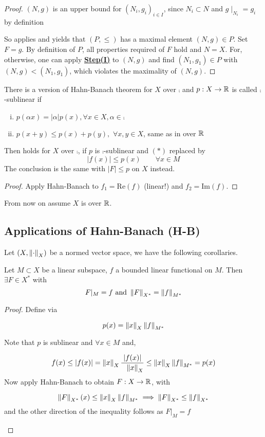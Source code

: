 \documentclass{article}
\begin{document}
\begin{proof}
$(N,g)$ is an upper bound for $(N_i, g_i)_{i \in I}$, since $N_i \subset N$ and $g\mid_{N_i} = g_i$ by definition  

So  applies and yields that $(P, \leq)$ has a maximal element $(N,g)\in P$. Set $F=g$.  
By definition of $P$, all properties required of $F$ hold and $N=X$. For, otherwise, one can apply \underline{\textbf{Step(I)}} to $(N,g)$ and find $(N_1, g_1) \in P$ with $(N,g) < (N_1, g_1)$, which violates the maximality of $(N,g)$.
\end{proof}


\begin{remark}
There is a version of Hahn-Banach theorem for $X$ over $\comp$ and $p: X\to \mathbb{R}$ is called $\comp$-sublinear if  
\begin{enumerate}[i)]
    \item $p(\alpha x) = |\alpha|p(x), \forall x \in X, \alpha \in \comp$
    \item $p(x+y) \leq p(x)+p(y),\,\,\forall x,y\in X$, same as in over $\mathbb{R}$
\end{enumerate}
Then  holds for $X$ over $\comp$, if $p$ is $\comp$-sublinear and $(*)$ replaced by  
$$
|f(x)| \leq p(x) \qquad \forall x \in M
$$  
The conclusion is the same with $|F|\leq p$ on $X$ instead.  
\begin{proof}
    Apply Hahn-Banach to $f_1 = \text{Re}(f)$ (linear!) and $f_2 = \text{Im}(f)$.
\end{proof}
\end{remark}  

From now on assume $X$ is over $\mathbb{R}$.

\subsection{Applications of Hahn-Banach (H-B)}  

Let $(X, \left\|{\cdot}\right\|_X)$ be a normed vector space, we have the following corollaries.  

\begin{corollary}
\label{same norm extension}
Let $M \subset X$ be a linear subspace, $f$ a bounded linear functional on $M$. Then $\exists F \in X^*$ with 
$$F |_M = f \ \text{and} \ \norm{F}_{X^*}=\norm{f}_{M^*}$$
\end{corollary}

\begin{proof}
Define  via  

$$p(x) = \left\|{x}\right\|_X \left\|{f}\right\|_{M^*}$$  

Note that $p$ is sublinear and $\forall x \in M$ and,  

$$f(x) \leq |f(x)|=\left\|{x}\right\|_X \frac{|f(x)|}{\hphantom{x} \left\|{x}\right\|_X} \leq \left\|{x}\right\|_X \left\|{f}\right\|_{M^*}=p(x)$$  
Now apply Hahn-Banach to obtain $F: X \to \mathbb{R}$, with  
\begin{unexaminable}
$$\left\|{F}\right\|_{X^*}(x) \leq \left\|{x}\right\|_X \left\|{f}\right\|_{M^*} \implies \left\|{F}\right\|_{X^*} \leq \left\|{f}\right\|_{X^*}$$
and the other direction of the inequality follows as $F |_M = f$
\end{unexaminable}
\end{proof}  
\end{document}

